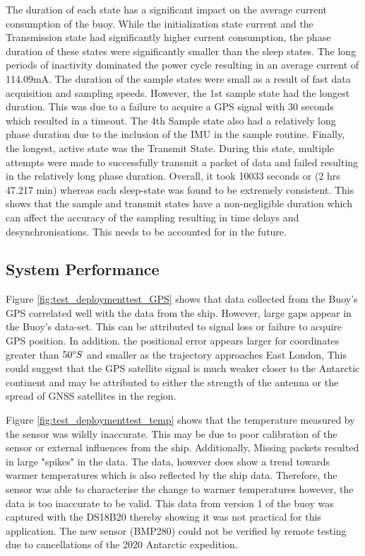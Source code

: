 The duration of each state has a significant impact on the average current consumption of the buoy. While the initialization state current and the Transmission state had significantly higher current consumption, the phase duration of these states were significantly smaller than the sleep states. The long periods of inactivity dominated the power cycle resulting in an average current of 114.09mA. The duration of the sample states were small as a result of fast data acquisition and sampling speeds. However, the 1st sample state had the longest duration. This was due to a failure to acquire a GPS signal with 30 seconds which resulted in a timeout. The 4th Sample state also had a relatively long phase duration due to the inclusion of the IMU in the sample routine. Finally, the longest, active state was the Transmit State. During this state, multiple attempts were made to successfully transmit a packet of data and failed resulting in the relatively long phase duration. Overall, it took 10033 seconds or (2 hrs 47.217 min) whereas each sleep-state was found to be extremely consistent. This shows that the sample and transmit states have a non-negligible duration which can affect the accuracy of the sampling resulting in time delays and desynchronisations. This needs to be accounted for in the future.

\subsection{System Performance}

Figure \ref{fig:test_deploymenttest_GPS} shows that data collected from the Buoy's GPS correlated well with the data from the ship. However, large gaps appear in the Buoy's data-set. This can be attributed to signal loss or failure to acquire GPS position. In addition. the positional error appears larger for coordinates greater than $50\degree S$ and smaller as the trajectory approaches East London, This could suggest that the GPS satellite signal is much weaker closer to the Antarctic continent and may be attributed to either the strength of the antenna or the spread of GNSS satellites in the region.

Figure \ref{fig:test_deploymenttest_temp} shows that the temperature measured by the sensor was wildly inaccurate. This may be due to poor calibration of the sensor or external influences from the ship. Additionally, Missing packets resulted in large "spikes" in the data. The data, however does show a trend towards warmer temperatures which is also reflected by the ship data. Therefore, the sensor was able to characterise the change to warmer temperatures however, the data is too inaccurate to be valid. This data from version 1 of the buoy was captured with the DS18B20 thereby showing it was not practical for this application. The new sensor (BMP280) could not be verified by remote testing due to cancellations of the 2020 Antarctic expedition.

